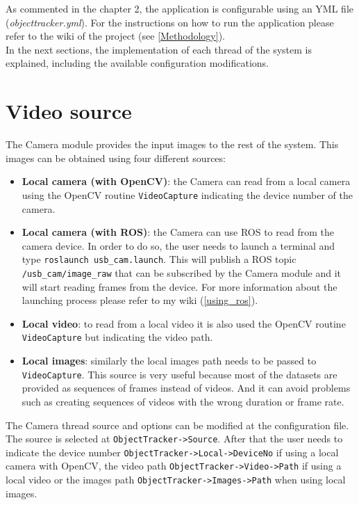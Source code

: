 As commented in the chapter 2, the application is configurable using an YML file (\textit{objecttracker.yml}). For the instructions on how to run the application please refer to the wiki of the project (see \ref{Methodology}).
\\In the next sections, the implementation of each thread of the system is explained, including the available configuration modifications.\\

\section{Video source}
The Camera module provides the input images to the rest of the system. This images can be obtained using four different sources:
\begin{itemize}
    \item \textbf{Local camera (with OpenCV)}: the Camera can read from a local camera using the OpenCV routine \texttt{VideoCapture} indicating the device number of the camera.
    \item \textbf{Local camera (with ROS)}: the Camera can use ROS to read from the camera device. In order to do so, the user needs to launch a terminal and type \texttt{roslaunch usb\_cam.launch}. This will publish a ROS topic \texttt{/usb\_cam/image\_raw} that can be subscribed by the Camera module and it will start reading frames from the device. For more information about the launching process please refer to my wiki (\ref{using_ros}).
    \item \textbf{Local video}: to read from a local video it is also used the OpenCV routine \texttt{VideoCapture} but indicating the video path.
\item \textbf{Local images}: similarly the local images path needs to be passed to \texttt{VideoCapture}. This source is very useful because most of the datasets are provided as sequences of frames instead of videos. And it can avoid problems such as creating sequences of videos with the wrong duration or frame rate.
\end{itemize}
The Camera thread source and options can be modified at the configuration file. The source is selected at \texttt{ObjectTracker->Source}. After that the user needs to indicate the device number \texttt{ObjectTracker->Local->DeviceNo} if using a local camera with OpenCV, the video path \texttt{ObjectTracker->Video->Path} if using a local video or the images path \texttt{ObjectTracker->Images->Path} when using local images.\\
